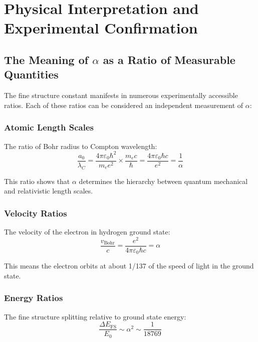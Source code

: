 \documentclass[12pt,a4paper]{article}
\theoremstyle{definition}
\begin{document}
	\section{Physical Interpretation and Experimental Confirmation}
	
	\subsection{The Meaning of $\alpha$ as a Ratio of Measurable Quantities}
	
	The fine structure constant manifests in numerous experimentally accessible ratios. Each of these ratios can be considered an independent measurement of $\alpha$:
	
	\subsubsection{Atomic Length Scales}
	
	The ratio of Bohr radius to Compton wavelength:
	\begin{equation}
		\frac{a_0}{\lambda_C} = \frac{4\pi\varepsilon_0\hbar^2}{m_e e^2} \times \frac{m_e c}{\hbar} = \frac{4\pi\varepsilon_0\hbar c}{e^2} = \frac{1}{\alpha}
	\end{equation}
	
	This ratio shows that $\alpha$ determines the hierarchy between quantum mechanical and relativistic length scales.
	
	\subsubsection{Velocity Ratios}
	
	The velocity of the electron in hydrogen ground state:
	\begin{equation}
		\frac{v_{\text{Bohr}}}{c} = \frac{e^2}{4\pi\varepsilon_0\hbar c} = \alpha
	\end{equation}
	
	This means the electron orbits at about 1/137 of the speed of light in the ground state.
	
	\subsubsection{Energy Ratios}
	
	The fine structure splitting relative to ground state energy:
	\begin{equation}
		\frac{\Delta E_{\text{FS}}}{E_0} \sim \alpha^2 \sim \frac{1}{18769}
	\end{equation}
	
\end{document}
